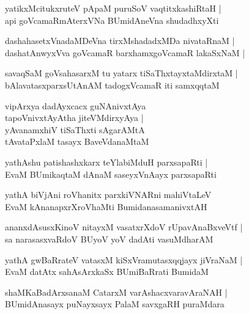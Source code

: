 \documentclass[twoside,12pt,openright]{book}
\newcounter{shloka}[chapter]
\begin{document}
\begin{shloka}%
yatikxMcitukxruteV pApaM puruSoV vaqtitxkashiRtaH |\\
api goVcamaRmAterxVNa BUmidAneVna shudadhxyXti
\end{shloka}

\begin{shloka}%
dashahasetxVnadaMDeVna tirxMshadadxMDa nivataRnaM |\\
dashatAnwyxVva goVcamaR barxhamxgoVcamaR lakaSxNaM |\\
\end{shloka}

\begin{shloka}%
savaqSaM goVsahasarxM tu yatarx tiSaThxtayxtaMdirxtaM |\\
bAlavatasxparxsUtAnAM tadogxVcamaR iti samxqqtaM 
\end{shloka}

\begin{shloka}%
vipArxya dadAyxcacx guNAnivxtAya \\
tapoVnivxtAyAtha jiteVMdirxyAya |\\
yAvanamxhiV tiSaThxti sAgarAMtA \\
tAvataPxlaM tasayx BaveVdanaMtaM 
\end{shloka}

\begin{shloka}%
yathAshu patishashxkarx teYlabiMduH parxsapaRti |\\
EvaM BUmikaqtaM dAnaM saseyxVnAayx parxsapaRti
\end{shloka}

\begin{shloka}%
yathA biVjAni roVhanitx parxkiVNARni mahiVtaLeV \\
EvaM kAnanapxrXroVhaMti BumidanasamanivxtAH 
\end{shloka}

\begin{shloka}%
ananxdAsusxKinoV nitayxM vasatxrXdoV rUpavAnaBxveVtf |\\
sa narasasxvaRdoV BUyoV yoV dadAti vasuMdharAM 
\end{shloka}

\begin{shloka}%
yathA gwBaRrateV vatasxM kiSxVramutasxqqjayx jiVraNaM |\\
EvaM datAtx sahAsArxkaSx BUmiBaRrati BumidaM 
\end{shloka}

\begin{shloka}%
shaMKaBadArxsanaM CatarxM varAshacxvaravAraNAH |\\
BUmidAnasayx puNayxsayx PalaM savxgaRH puraMdara
\end{shloka}
\end{document}
